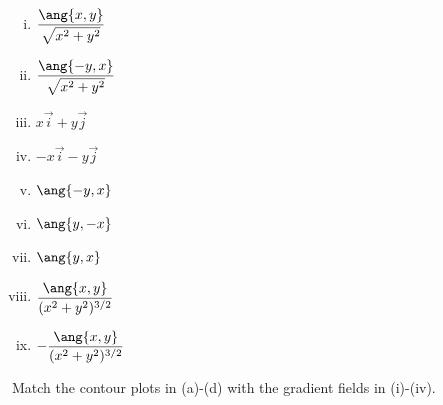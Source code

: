 \documentclass[12pt,reqno]{amsart}
\begin{document}
\begin{enumerate}[(i)]
\item $\displaystyle\frac{\ang{x,y}}{\sqrt{x^2+y^2}}$\bigskip
\item $\displaystyle\frac{\ang{-y,x}}{\sqrt{x^2+y^2}}$\bigskip
\item $x\vec{i} + y \vec{j}$\bigskip
\item $-x\vec{i} - y \vec{j}$\bigskip
\item $\ang{-y,x}$\bigskip
\item $\ang{y,-x}$\bigskip
\item $\ang{y,x}$\bigskip
\item $\displaystyle\frac{\ang{x,y}}{(x^2+y^2)^{3/2}}$\bigskip
\item $-\displaystyle\frac{\ang{x,y}}{(x^2+y^2)^{3/2}}$
\end{enumerate}

\newpage
\prob Match the contour plots in (a)-(d) with the gradient fields in (i)-(iv).
\end{document}
